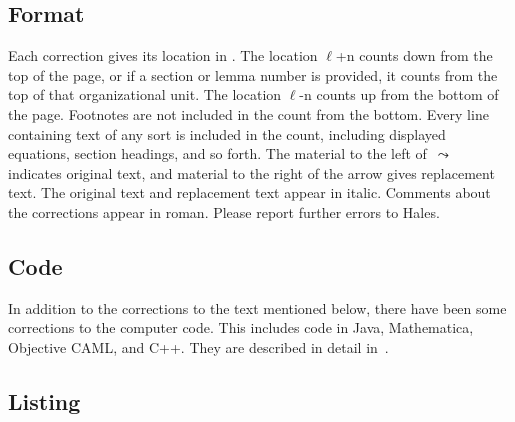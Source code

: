 \documentclass[11pt]{amsart}
\def\lto{\ensuremath{\,\leadsto\,}}
\def\line{$\ell$}
\begin{document}
\subsection*{Format}

Each correction gives its location in \cite{Hales:2006:DCG}.
The location
\line+n counts down from the top of the page, or
if a section or lemma number is provided, it
counts from the top of that organizational unit.
The location \line-n counts up from the bottom
of the page. Footnotes are not included in the
count from the bottom.  Every line containing
text of any sort is included in the count,
including displayed equations, section headings,
and so forth.  The material to the left of $\lto$ 
indicates original text, and material to the right of the
arrow gives replacement text.  
The original text and replacement text appear in italic.
Comments about the corrections appear in roman. 
Please report further errors to Hales.


\subsection*{Code}

In addition to the corrections to the text mentioned below, 
there have been some corrections to the computer code.
This includes code in Java, Mathematica, Objective CAML, and C++.
They are described in detail in~\cite{Hales:2008:Errata}.


\subsection*{Listing}\hfill\break
\end{document}
